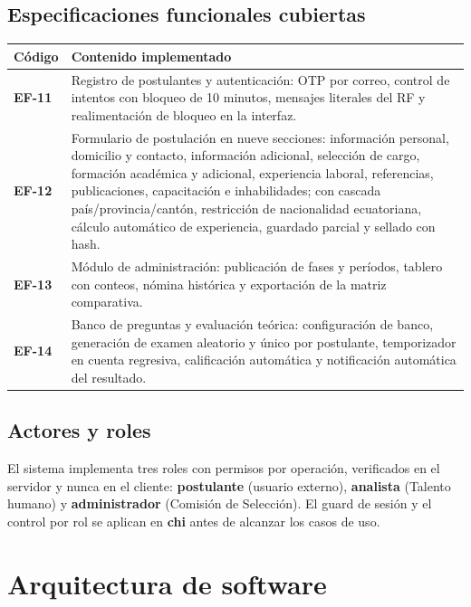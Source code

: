 \documentclass[11pt,a4paper]{article}
\newcommand{\ent}[1]{\textsf{\textbf{#1}}}
\begin{document}
\subsection{Especificaciones funcionales cubiertas}

\begin{tabularx}{\textwidth}{@{}>{\bfseries\color{upseAzul}}l X@{}}
\toprule
C\'odigo & Contenido implementado \\
\midrule
EF-11 & Registro de postulantes y autenticaci\'on: OTP por correo, control de intentos con bloqueo
de 10 minutos, mensajes literales del RF y realimentaci\'on de bloqueo en la interfaz. \\
EF-12 & Formulario de postulaci\'on en nueve secciones: informaci\'on personal, domicilio y contacto,
informaci\'on adicional, selecci\'on de cargo, formaci\'on acad\'emica y adicional, experiencia laboral,
referencias, publicaciones, capacitaci\'on e inhabilidades; con cascada pa\'is/provincia/cant\'on,
restricci\'on de nacionalidad ecuatoriana, c\'alculo autom\'atico de experiencia, guardado parcial y
sellado con hash. \\
EF-13 & M\'odulo de administraci\'on: publicaci\'on de fases y per\'iodos, tablero con conteos,
n\'omina hist\'orica y exportaci\'on de la matriz comparativa. \\
EF-14 & Banco de preguntas y evaluaci\'on te\'orica: configuraci\'on de banco, generaci\'on de examen
aleatorio y \'unico por postulante, temporizador en cuenta regresiva, calificaci\'on autom\'atica y
notificaci\'on autom\'atica del resultado. \\
\bottomrule
\end{tabularx}

\subsection{Actores y roles}

El sistema implementa tres roles con permisos por operaci\'on, verificados en el servidor y nunca en el
cliente: \ent{postulante} (usuario externo), \ent{analista} (Talento humano) y \ent{administrador}
(Comisi\'on de Selecci\'on). El guard de sesi\'on y el control por rol se aplican en \ent{chi} antes de
alcanzar los casos de uso.

\section{Arquitectura de software}
\end{document}
